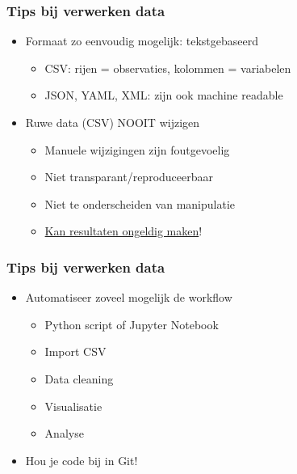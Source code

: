 \documentclass[aspectratio=169]{beamer}
\begin{document}
\begin{frame}
  \frametitle{Tips bij verwerken data}

  \begin{itemize}
    \item Formaat zo eenvoudig mogelijk: tekstgebaseerd
    
    \begin{itemize}
      \item CSV: rijen = observaties, kolommen = variabelen
      \item JSON, YAML, XML: zijn ook machine readable
    \end{itemize}

    \item Ruwe data (CSV) NOOIT wijzigen
    
    \begin{itemize}
      \item Manuele wijzigingen zijn foutgevoelig
      \item Niet transparant/reproduceerbaar
      \item Niet te onderscheiden van manipulatie
      \item \href{https://www.bbc.com/news/technology-37176926}{Kan resultaten ongeldig maken}!
    \end{itemize}

  \end{itemize}

\end{frame}

\begin{frame}
  \frametitle{Tips bij verwerken data}

  \begin{itemize}
    \item Automatiseer zoveel mogelijk de workflow
          \begin{itemize}
            \item Python script of Jupyter Notebook
            \item Import CSV
            \item Data cleaning
            \item Visualisatie
            \item Analyse
          \end{itemize}
    \item Hou je code bij in Git!
  \end{itemize}


\end{frame}
\end{document}
